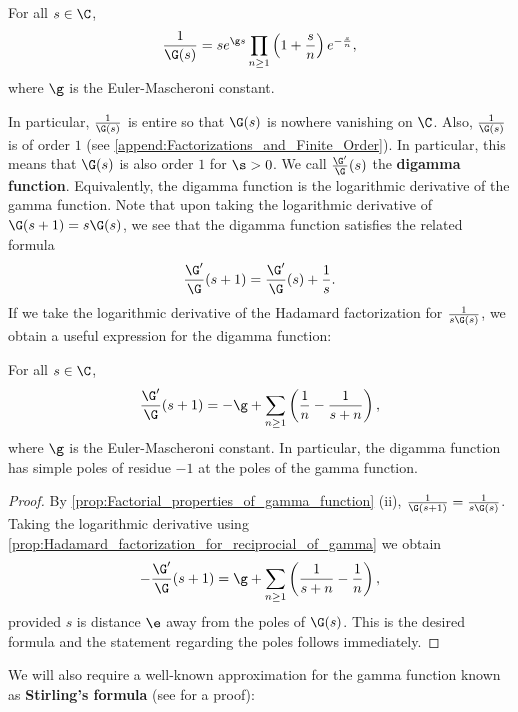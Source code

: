       \begin{proposition}\label{prop:Hadamard_factorization_for_reciprocial_of_gamma}
        For all $s \in \C$,
        \[
          \frac{1}{\G(s)} = se^{\g s}\prod_{n \ge 1}\left(1+\frac{s}{n}\right)e^{-\frac{s}{n}},
        \]
        where $\g$ is the Euler-Mascheroni constant.
      \end{proposition}

      In particular, $\frac{1}{\G(s)}$ is entire so that $\G(s)$ is nowhere vanishing on $\C$. Also, $\frac{1}{\G(s)}$ is of order $1$ (see \cref{append:Factorizations_and_Finite_Order}). In particular, this means that $\G(s)$ is also order $1$ for $\s > 0$. We call $\frac{\G'}{\G}(s)$ the \textbf{digamma function}. Equivalently, the digamma function is the logarithmic derivative of the gamma function. Note that upon taking the logarithmic derivative of $\G(s+1) = s\G(s)$, we see that the digamma function satisfies the related formula
      \[
        \frac{\G'}{\G}(s+1) = \frac{\G'}{\G}(s)+\frac{1}{s}.
      \]
      If we take the logarithmic derivative of the Hadamard factorization for $\frac{1}{s\G(s)}$, we obtain a useful expression for the digamma function:

      \begin{corollary}\label{cor:logarithmic_derivative_of_gamma}
        For all $s \in \C$,
        \[
          \frac{\G'}{\G}(s+1) = -\g+\sum_{n \ge 1}\left(\frac{1}{n}-\frac{1}{s+n}\right),
        \]
        where $\g$ is the Euler-Mascheroni constant. In particular, the digamma function has simple poles of residue $-1$ at the poles of the gamma function.
      \end{corollary}
      \begin{proof}
        By \cref{prop:Factorial_properties_of_gamma_function} (ii), $\frac{1}{\G(s+1)} = \frac{1}{s\G(s)}$. Taking the logarithmic derivative using \cref{prop:Hadamard_factorization_for_reciprocial_of_gamma} we obtain
        \[
          -\frac{\G'}{\G}(s+1) = \g+\sum_{n \ge 1}\left(\frac{1}{s+n}-\frac{1}{n}\right),
        \]
        provided $s$ is distance $\e$ away from the poles of $\G(s)$. This is the desired formula and the statement regarding the poles follows immediately.
      \end{proof}
      
      We will also require a well-known approximation for the gamma function known as \textbf{Stirling's formula} (see \cite{remmert1998classical} for a proof):

